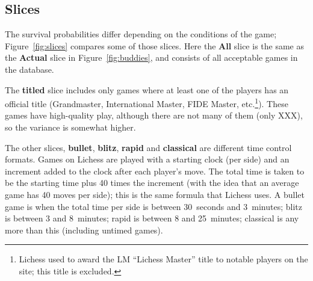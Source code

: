 \documentclass[twocolumn]{article}
\begin{document}
\subsection{Slices} \label{sec:slices}
The survival probabilities differ depending on the conditions of the
game; Figure~\ref{fig:slices} compares some of those slices. Here the
{\bf All} slice is the same as the {\bf Actual} slice in
Figure~\ref{fig:buddies}, and consists of all acceptable games in the
database.

The {\bf titled} slice includes only games where at least one of the
players has an official title (Grandmaster, International Master, FIDE
Master, etc.\footnote{Lichess used to award the LM ``Lichess Master'' title
  to notable players on the site; this title is excluded.}). These
games have high-quality play, although there are not many of them
(only XXX), so the variance is somewhat higher. %

The other slices, {\bf bullet}, {\bf blitz}, {\bf rapid} and {\bf
  classical} are different time control formats. Games on Lichess are
played with a starting clock (per side) and an increment added to the
clock after each player's move. The total time is taken to be the
starting time plus 40 times the increment (with the idea that an
average game has 40 moves per side); this is the same formula that
Lichess uses. A bullet game is when the total time per side is
between 30~seconds and 3~minutes; blitz is between 3 and 8~minutes;
rapid is between 8 and 25~minutes; classical is any more than this
(including untimed games).



{}

\end{document}
